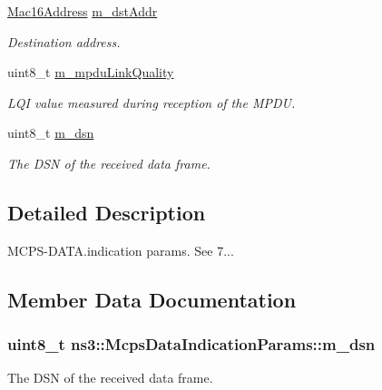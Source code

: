 \begin{DoxyCompactItemize}
\hyperlink{classns3_1_1Mac16Address}{Mac16\+Address} \hyperlink{structns3_1_1McpsDataIndicationParams_a02aa5d21326ac78f6bde548ef5609105}{m\+\_\+dst\+Addr}
\begin{DoxyCompactList}\small\item\em Destination address. \end{DoxyCompactList}\item 
uint8\+\_\+t \hyperlink{structns3_1_1McpsDataIndicationParams_a5ecdfa006a055bc1bbf14fe4ac039c62}{m\+\_\+mpdu\+Link\+Quality}
\begin{DoxyCompactList}\small\item\em L\+QI value measured during reception of the M\+P\+DU. \end{DoxyCompactList}\item 
uint8\+\_\+t \hyperlink{structns3_1_1McpsDataIndicationParams_a40a7d5d8f8b803f13d9438f158cc3e56}{m\+\_\+dsn}
\begin{DoxyCompactList}\small\item\em The D\+SN of the received data frame. \end{DoxyCompactList}\end{DoxyCompactItemize}


\subsection{Detailed Description}
M\+C\+P\+S-\/\+D\+A\+T\+A.\+indication params. See 7... 

\subsection{Member Data Documentation}
\subsubsection[{\texorpdfstring{m\+\_\+dsn}{m_dsn}}]{\setlength{\rightskip}{0pt plus 5cm}uint8\+\_\+t ns3\+::\+Mcps\+Data\+Indication\+Params\+::m\+\_\+dsn}\hypertarget{structns3_1_1McpsDataIndicationParams_a40a7d5d8f8b803f13d9438f158cc3e56}{}\label{structns3_1_1McpsDataIndicationParams_a40a7d5d8f8b803f13d9438f158cc3e56}


The D\+SN of the received data frame. 

